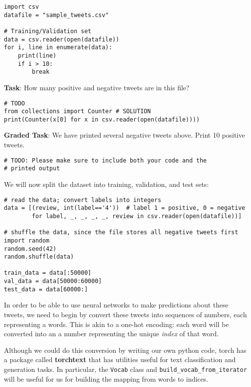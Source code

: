 \documentclass[
  letterpaper,
  DIV=11,
  numbers=noendperiod]{scrartcl}
\begin{document}
\begin{verbatim}
import csv
datafile = "sample_tweets.csv"

# Training/Validation set
data = csv.reader(open(datafile))
for i, line in enumerate(data):
    print(line)
    if i > 10:
        break
\end{verbatim}

\textbf{Task}: How many positive and negative tweets are in this file?

\begin{verbatim}
# TODO
from collections import Counter # SOLUTION
print(Counter(x[0] for x in csv.reader(open(datafile))))
\end{verbatim}

\textbf{Graded Task}: We have printed several negative tweets above.
Print 10 positive tweets.

\begin{verbatim}
# TODO: Please make sure to include both your code and the
# printed output
\end{verbatim}

We will now split the dataset into training, validation, and test sets:

\begin{verbatim}
# read the data; convert labels into integers
data = [(review, int(label=='4'))  # label 1 = positive, 0 = negative
        for label, _, _, _, _, review in csv.reader(open(datafile))]

# shuffle the data, since the file stores all negative tweets first
import random
random.seed(42)
random.shuffle(data)

train_data = data[:50000] 
val_data = data[50000:60000] 
test_data = data[60000:]
\end{verbatim}

In order to be able to use neural networks to make predictions about
these tweets, we need to begin by convert these tweets into sequences of
numbers, each representing a words. This is akin to a one-hot encoding:
each word will be converted into an a number representing the unique
\emph{index} of that word.

Although we could do this conversion by writing our own python code,
torch has a package called \textbf{torchtext} that has utilities useful
for text classification and generation tasks. In particular, the
\texttt{Vocab} class and \texttt{build\_vocab\_from\_iterator} will be
useful for us for building the mapping from words to indices.
\end{document}
